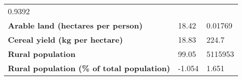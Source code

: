 \documentclass[
]{article}
\begin{document}
\begin{longtable}[]{@{}lll@{}}
\begin{minipage}[t]{0.14\columnwidth}
0.9392\strut
\end{minipage}\tabularnewline
\begin{minipage}[t]{0.22\columnwidth}\raggedright
\textbf{Arable land (hectares per person)}\strut
\end{minipage} & \begin{minipage}[t]{0.14\columnwidth}\raggedright
18.42\strut
\end{minipage} & \begin{minipage}[t]{0.14\columnwidth}\raggedright
0.01769\strut
\end{minipage}\tabularnewline
\begin{minipage}[t]{0.22\columnwidth}\raggedright
\textbf{Cereal yield (kg per hectare)}\strut
\end{minipage} & \begin{minipage}[t]{0.14\columnwidth}\raggedright
18.83\strut
\end{minipage} & \begin{minipage}[t]{0.14\columnwidth}\raggedright
224.7\strut
\end{minipage}\tabularnewline
\begin{minipage}[t]{0.22\columnwidth}\raggedright
\textbf{Rural population}\strut
\end{minipage} & \begin{minipage}[t]{0.14\columnwidth}\raggedright
99.05\strut
\end{minipage} & \begin{minipage}[t]{0.14\columnwidth}\raggedright
5115953\strut
\end{minipage}\tabularnewline
\begin{minipage}[t]{0.22\columnwidth}\raggedright
\textbf{Rural population (\% of total population)}\strut
\end{minipage} & \begin{minipage}[t]{0.14\columnwidth}\raggedright
-1.054\strut
\end{minipage} & \begin{minipage}[t]{0.14\columnwidth}\raggedright
1.651\strut
\end{minipage}\tabularnewline
\bottomrule
\end{longtable}
\end{document}
